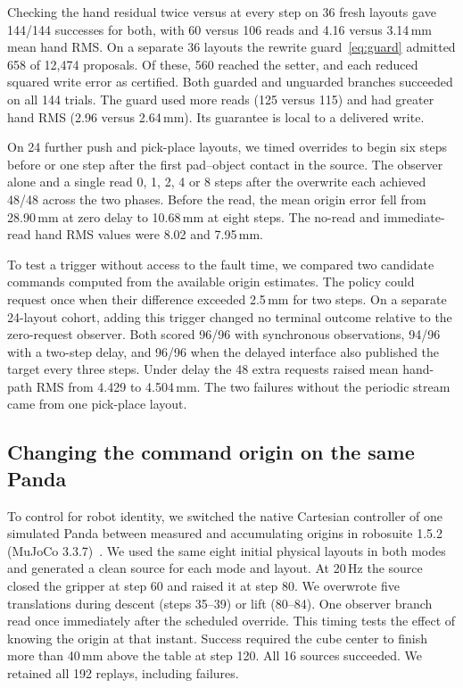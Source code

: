 Checking the hand residual twice versus at every step on 36 fresh layouts gave 144/144 successes for both, with 60 versus 106 reads and 4.16 versus 3.14\,mm mean hand RMS. On a separate 36 layouts the rewrite guard~\eqref{eq:guard} admitted 658 of 12,474 proposals. Of these, 560 reached the setter, and each reduced squared write error as certified. Both guarded and unguarded branches succeeded on all 144 trials. The guard used more reads (125 versus 115) and had greater hand RMS (2.96 versus 2.64\,mm). Its guarantee is local to a delivered write.

On 24 further push and pick-place layouts, we timed overrides to begin six steps before or one step after the first pad--object contact in the source. The observer alone and a single read 0, 1, 2, 4 or 8 steps after the overwrite each achieved 48/48 across the two phases. Before the read, the mean origin error fell from 28.90\,mm at zero delay to 10.68\,mm at eight steps. The no-read and immediate-read hand RMS values were 8.02 and 7.95\,mm.

To test a trigger without access to the fault time, we compared two candidate commands computed from the available origin estimates. The policy could request once when their difference exceeded 2.5\,mm for two steps. On a separate 24-layout cohort, adding this trigger changed no terminal outcome relative to the zero-request observer. Both scored 96/96 with synchronous observations, 94/96 with a two-step delay, and 96/96 when the delayed interface also published the target every three steps. Under delay the 48 extra requests raised mean hand-path RMS from 4.429 to 4.504\,mm. The two failures without the periodic stream came from one pick-place layout.

\subsection{Changing the command origin on the same Panda}
To control for robot identity, we switched the native Cartesian controller of one simulated Panda between measured and accumulating origins in robosuite 1.5.2 (MuJoCo 3.3.7)~\cite{robosuite2020}. We used the same eight initial physical layouts in both modes and generated a clean source for each mode and layout. At 20\,Hz the source closed the gripper at step 60 and raised it at step 80. We overwrote five translations during descent (steps 35--39) or lift (80--84). One observer branch read once immediately after the scheduled override. This timing tests the effect of knowing the origin at that instant. Success required the cube center to finish more than 40\,mm above the table at step 120. All 16 sources succeeded. We retained all 192 replays, including failures.

